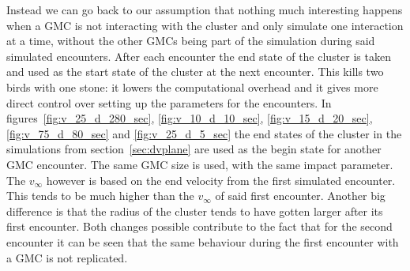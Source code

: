 \documentclass{aa}
\begin{document}
Instead we can go back to our assumption that nothing much interesting happens when a GMC is not interacting with the cluster and only simulate one interaction at a time, without the other GMCs being part of the simulation during said simulated encounters. After each encounter the end state of the cluster is taken and used as the start state of the cluster at the next encounter. This kills two birds with one stone: it lowers the computational overhead and it gives more direct control over setting up the parameters for the encounters.
In figures~\ref{fig:v_25_d_280_sec}, \ref{fig:v_10_d_10_sec}, \ref{fig:v_15_d_20_sec}, \ref{fig:v_75_d_80_sec} and \ref{fig:v_25_d_5_sec} the end states of the cluster in the simulations from section~\ref{sec:dvplane} are used as the begin state for another GMC encounter. The same GMC size is used, with the same impact parameter. The $v_\infty$ however is based on the end velocity from the first simulated encounter. This tends to be much higher than the $v_\infty$ of said first encounter. Another big difference is that the radius of the cluster tends to have gotten larger after its first encounter. Both changes possible contribute to the fact that for the second encounter it can be seen that the same behaviour during the first encounter with a GMC is not replicated.
\end{document}
